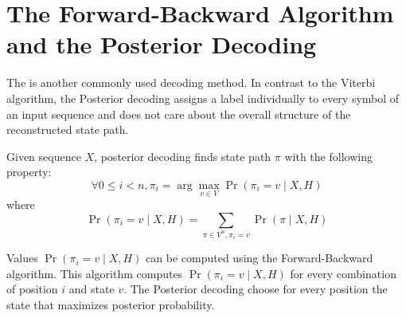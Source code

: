 \section{The Forward-Backward Algorithm and  the Posterior Decoding}

The  is another commonly used decoding method. In
contrast to the Viterbi algorithm, the Posterior decoding assigns a label individually to
every symbol of an input sequence and does not care about the overall structure of
the reconstructed state path. 

Given sequence $X$, posterior decoding finds state path $\pi$ with the following
property:
\[\forall 0\leq i< n, \pi_i=\arg\max_{v\in V}\Pr\left(\pi_i=v\mid X,H\right) \]
where \[\Pr\left(\pi_i=v\mid X,H\right) = \sum_{\pi\in V^n,\pi_i=v}\Pr\left(\pi\mid X,H\right)\]

Values $\Pr\left(\pi_i=v\mid X,H\right)$ can be computed using the Forward-Backward
algorithm. This algorithm computes $\Pr\left(\pi_i=v\mid X,H\right)$ for every
combination of position $i$ and state $v$. The Posterior decoding choose for
every position the state that maximizes posterior probability.

